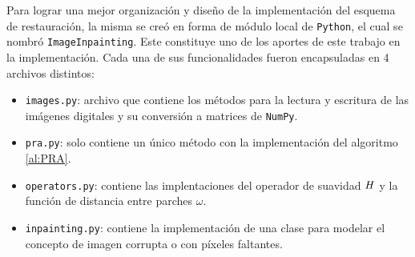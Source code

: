 Para lograr una mejor organizaci\'on y diseño de la implementaci\'on del esquema de restauraci\'on, la misma se cre\'o en forma de m\'odulo local de \texttt{Python}, el cual se nombr\'o \texttt{ImageInpainting}. Este constituye uno de los aportes de este trabajo en la implementación. Cada una de sus funcionalidades fueron encapsuladas en 4 archivos distintos:
\begin{itemize}
	\item \texttt{images.py}: archivo que contiene los m\'etodos para la lectura y escritura de las im\'agenes digitales y su conversi\'on a matrices de \texttt{NumPy}.
	\item \texttt{pra.py}: solo contiene un \'unico m\'etodo con la implementaci\'on del algoritmo \ref{al:PRA}.
	\item \texttt{operators.py}: contiene las implentaciones del operador de suavidad $\mathit{H}$ y la funci\'on de distancia entre parches $\omega$.
	\item \texttt{inpainting.py}: contiene la implementaci\'on de una clase para modelar el concepto de imagen corrupta o con p\'ixeles faltantes.
\end{itemize}

